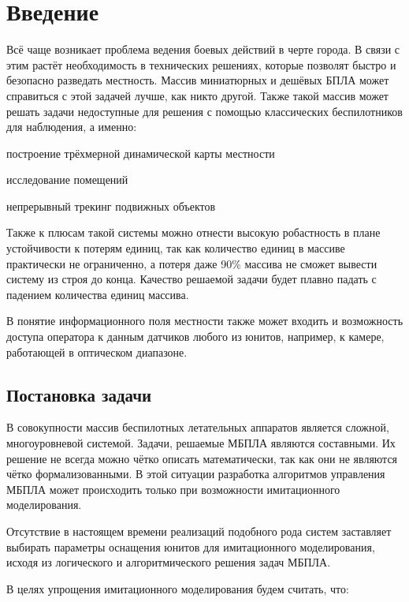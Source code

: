 \section{Введение}

Всё чаще возникает проблема ведения боевых действий
в черте города. В связи с этим растёт необходимость в технических
решениях, которые позволят быстро и безопасно разведать местность.
Массив миниатюрных и дешёвых БПЛА может справиться с этой задачей 
лучше, как никто другой. Также такой массив может решать задачи недоступные
для решения с помощью классических беспилотников для наблюдения, а именно: 
\begin{mintemize}
    \item построение трёхмерной динамической карты местности
    \item исследование помещений
    \item непрерывный трекинг подвижных объектов
\end{mintemize}

Также к плюсам такой системы можно отнести высокую робастность в плане
устойчивости к потерям единиц, так как количество единиц в массиве
практически не ограниченно, а потеря даже 90\% массива не сможет
вывести систему из строя до конца. Качество решаемой задачи
будет плавно падать с падением количества единиц массива.

В понятие информационного поля местности также может входить
и возможность доступа оператора к данным датчиков любого из юнитов, например,
к камере, работающей в оптическом диапазоне.

\subsection{Постановка задачи}

В совокупности массив беспилотных летательных аппаратов является сложной,
многоуровневой системой. Задачи, решаемые МБПЛА являются составными.
Их решение не всегда можно чётко описать математически, так как они не
являются чётко формализованными.  В этой ситуации разработка алгоритмов
управления МБПЛА может происходить только при возможности имитационного
моделирования.

Отсутствие в настоящем времени реализаций подобного рода систем заставляет
выбирать параметры оснащения юнитов для имитационного моделирования, исходя
из логического и алгоритмического решения задач МБПЛА.

В целях упрощения имитационного моделирования будем считать, что:

